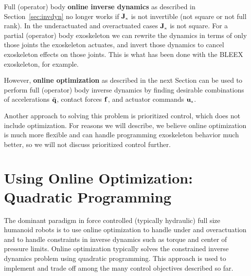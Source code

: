 \documentclass[letterpaper,12pt,fullpage]{article}
\newcommand{\myx}{{\mbox {\tiny x}}}
\begin{document}
Full (operator) body
{\bf online inverse dynamics} as described in Section~\ref{sec:invdyn}
no longer works if $\mJ_{\myx}$ is not invertible (not square or not full rank).
In the underactuated and overactuated cases $\mJ_{\myx}$ is not square. 
For a partial (operator) body
exoskeleton we can rewrite the dynamics in terms of only those
joints the exoskeleton actuates, and invert those dynamics to cancel exoskeleton
effects on those joints. This is what has been done with the BLEEX exoskeleton,
for example.

However, {\bf online optimization}
as described in the next Section can be used to perform full (operator)
body inverse dynamics by
finding desirable combinations of accelerations $\ddot{{\bf q}}$, contact forces ${\bf f}$,
and actuator commands $\vu_{\myx}$.

Another approach to solving this problem is prioritized control, which does
not include optimization.
For reasons we will describe, we believe
online optimization is much more flexible and can handle programming exoskeleton
behavior much better, so we will not discuss prioritized control further.

\section{Using Online Optimization: Quadratic Programming}
\label{sec:qp}

The dominant paradigm in force controlled (typically
hydraulic) full size humanoid robots is to use online optimization
to handle under and overactuation
and to handle constraints in inverse dynamics
such as torque and center of pressure limits.
Online optimization typically solves the constrained inverse dynamics problem
using quadratic programming.
This approach is used
to implement and trade off among the many control objectives described so far.
\end{document}
